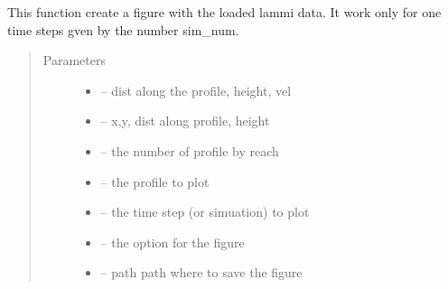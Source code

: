 \documentclass[letterpaper,10pt,english]{sphinxmanual}
\begin{document}

\begin{fulllineitems}
\label{\detokenize{index:src.lammi.fig_lammi}}
This function create a figure with the loaded lammi data.
It work only for one time steps gven by the number sim\_num.
\begin{quote}\begin{description}
\item[{Parameters}] \leavevmode\begin{itemize}
\item {} 
 -- dist along the profile, height, vel

\item {} 
 -- x,y, dist along profile, height

\item {} 
 -- the number of profile by reach

\item {} 
 -- the profile to plot

\item {} 
 -- the time step (or simuation) to plot

\item {} 
 -- the option for the figure

\item {} 
 -- path path where to save the figure

\end{itemize}

\end{description}\end{quote}

\end{fulllineitems}

\end{document}
